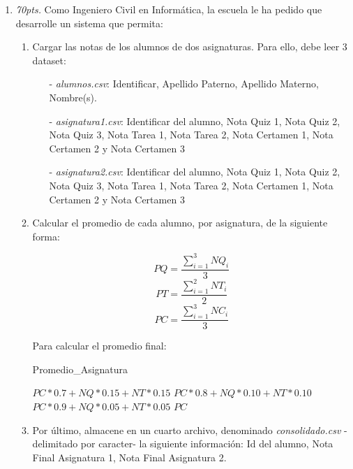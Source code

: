 \documentclass[10pt]{article}
\begin{document}
{\begin{enumerate}
\begin{multicols}{2}
		\end{multicols}
		
		\newpage

		\item \emph{70pts.} Como Ingeniero Civil en Inform\'atica, la escuela le ha pedido que desarrolle un sistema que permita:

        \begin{enumerate}
            \item Cargar las notas de los alumnos de dos asignaturas. Para ello, debe leer 3 dataset: 
            \begin{itemize}
                \item[-] \emph{alumnos.csv}: Identificar, Apellido Paterno, Apellido Materno, Nombre(s).
                \item[-] \emph{asignatura1.csv}: Identificar del alumno, Nota Quiz 1, Nota Quiz 2, Nota Quiz 3, Nota Tarea 1, Nota Tarea 2, Nota Certamen 1, Nota Certamen 2 y Nota Certamen 3
                \item[-] \emph{asignatura2.csv}: Identificar del alumno, Nota Quiz 1, Nota Quiz 2, Nota Quiz 3, Nota Tarea 1, Nota Tarea 2, Nota Certamen 1, Nota Certamen 2 y Nota Certamen 3
            \end{itemize}
            \item Calcular el promedio de cada alumno, por asignatura, de la siguiente forma:
            \begin{multicols}{3}
                $$PQ = \frac{\displaystyle\sum_{i=1}^{3}NQ_{i}}{3}$$
                $$PT = \frac{\displaystyle\sum_{i=1}^{2}NT_{i}}{2}$$
                $$PC = \frac{\displaystyle\sum_{i=1}^{3}NC_{i}}{3}$$
            \end{multicols}
            Para calcular el promedio final:
                \begin{algorithm}[!ht]
                	    \caption{Promedio\_Asignatura}
                    \begin{algorithmic}%
                            \RETURN $PC * 0.7 + NQ * 0.15 + NT * 0.15$
                            \RETURN $PC * 0.8 + NQ * 0.10 + NT * 0.10$
                            \RETURN $PC * 0.9 + NQ * 0.05 + NT * 0.05$
                        \ELSE
                            \RETURN $PC$
                        \ENDIF
                    \end{algorithmic}
                \end{algorithm}	
            \item Por \'ultimo, almacene en un cuarto archivo, denominado \emph{consolidado.csv} -delimitado por caracter- la siguiente informaci\'on: Id del alumno, Nota Final Asignatura 1, Nota Final Asignatura 2.
        \end{enumerate}
	\end{enumerate}}
\end{document}
